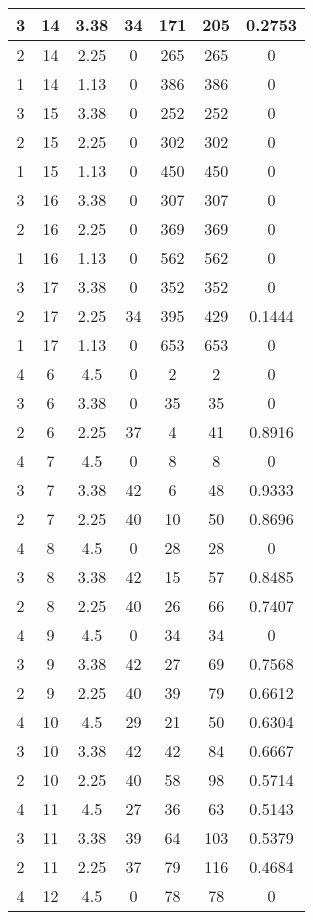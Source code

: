 \documentclass[letterpaper, 12pt]{article}
\begin{document}
\begin{longtable}{|c|c|c|c|c|c|c|}
\hline
3 & 14 & 3.38 & 34 & 171 & 205 & 0.2753 \\
\hline
2 & 14 & 2.25 & 0 & 265 & 265 & 0 \\
\hline
1 & 14 & 1.13 & 0 & 386 & 386 & 0 \\
\hline
3 & 15 & 3.38 & 0 & 252 & 252 & 0 \\
\hline
2 & 15 & 2.25 & 0 & 302 & 302 & 0 \\
\hline
1 & 15 & 1.13 & 0 & 450 & 450 & 0 \\
\hline
3 & 16 & 3.38 & 0 & 307 & 307 & 0 \\
\hline
2 & 16 & 2.25 & 0 & 369 & 369 & 0 \\
\hline
1 & 16 & 1.13 & 0 & 562 & 562 & 0 \\
\hline
3 & 17 & 3.38 & 0 & 352 & 352 & 0 \\
\hline
2 & 17 & 2.25 & 34 & 395 & 429 & 0.1444 \\
\hline
1 & 17 & 1.13 & 0 & 653 & 653 & 0 \\
\hline
4 & 6 & 4.5 & 0 & 2 & 2 & 0 \\
\hline
3 & 6 & 3.38 & 0 & 35 & 35 & 0 \\
\hline
2 & 6 & 2.25 & 37 & 4 & 41 & 0.8916 \\
\hline
4 & 7 & 4.5 & 0 & 8 & 8 & 0 \\
\hline
3 & 7 & 3.38 & 42 & 6 & 48 & 0.9333 \\
\hline
2 & 7 & 2.25 & 40 & 10 & 50 & 0.8696 \\
\hline
4 & 8 & 4.5 & 0 & 28 & 28 & 0 \\
\hline
3 & 8 & 3.38 & 42 & 15 & 57 & 0.8485 \\
\hline
2 & 8 & 2.25 & 40 & 26 & 66 & 0.7407 \\
\hline
4 & 9 & 4.5 & 0 & 34 & 34 & 0 \\
\hline
3 & 9 & 3.38 & 42 & 27 & 69 & 0.7568 \\
\hline
2 & 9 & 2.25 & 40 & 39 & 79 & 0.6612 \\
\hline
4 & 10 & 4.5 & 29 & 21 & 50 & 0.6304 \\
\hline
3 & 10 & 3.38 & 42 & 42 & 84 & 0.6667 \\
\hline
2 & 10 & 2.25 & 40 & 58 & 98 & 0.5714 \\
\hline
4 & 11 & 4.5 & 27 & 36 & 63 & 0.5143 \\
\hline
3 & 11 & 3.38 & 39 & 64 & 103 & 0.5379 \\
\hline
2 & 11 & 2.25 & 37 & 79 & 116 & 0.4684 \\
\hline
4 & 12 & 4.5 & 0 & 78 & 78 & 0 \\

\end{longtable}
\end{document}
